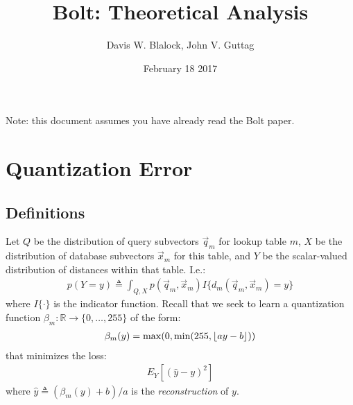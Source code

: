 \documentclass[]{article}
\begin{document}
\title{Bolt: Theoretical Analysis}

\author{Davis W. Blalock, John V. Guttag}



\date{\Large February 18 2017}
\maketitle

Note: this document assumes you have already read the Bolt paper.

\section{Quantization Error}

\subsection{Definitions}

Let $Q$ be the distribution of query subvectors $\vec{q}_m$ for lookup table $m$, $X$ be the distribution of database subvectors $\vec{x}_m$ for this table, and $Y$ be the scalar-valued distribution of distances within that table. I.e.:
\begin{align}
    p(Y = y) \triangleq \int_{Q, X} p(\vec{q}_m, \vec{x}_m)I\{d_m(\vec{q}_m, \vec{x}_m) = y\}
\end{align}
where $I\{\cdot\}$ is the indicator function. Recall that we seek to learn a quantization function $\beta_m: \mathbb{R} \rightarrow \{0,\ldots,255\}$ of the form:
\begin{align}
    \beta_m(y) = \max(0, \min(255, \floor*{ay - b}))
\end{align}
\noindent that minimizes the loss:
\begin{align}
    E_Y[(\hat{y} - y)^2]
\end{align}
where $\hat{y} \triangleq (\beta_m(y) + b)/a$ is the \textit{reconstruction} of $y$.
\end{document}
